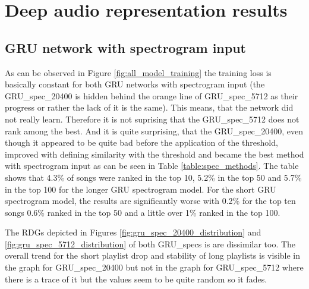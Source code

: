 \section{Deep audio representation results}\label{sec:deep_audio_results}

\subsection{GRU network with spectrogram input}\label{ssec:gru_spec_results}

As can be observed in Figure \ref{fig:all_model_training} the training loss is basically constant for both GRU networks with spectrogram input (the GRU\_spec\_20400 is hidden behind the orange line of GRU\_spec\_5712 as their progress or rather the lack of it is the same). This means, that the network did not really learn. Therefore it is not suprising that the GRU\_spec\_5712 does not rank among the best. And it is quite surprising, that the GRU\_spec\_20400, even though it appeared to be quite bad before the application of the threshold, improved with defining similarity with the threshold and became the best method with spectrogram input as can be seen in Table \ref{table:spec_methods}. The table shows that 4.3\% of songs were ranked in the top 10, 5.2\% in the top 50 and 5.7\% in the top 100 for the longer GRU spectrogram model. For the short GRU spectrogram model, the results are significantly worse with 0.2\% for the top ten songs 0.6\% ranked in the top 50 and a little over 1\% ranked in the top 100. 

The RDGs depicted in Figures \ref{fig:gru_spec_20400_distribution} and \ref{fig:gru_spec_5712_distribution} of both GRU\_specs is are dissimilar too. The overall trend for the short playlist drop and stability of long playlists is visible in the graph for GRU\_spec\_20400 but not in the graph for GRU\_spec\_5712 where there is a trace of it but the values seem to be quite random so it fades. 

